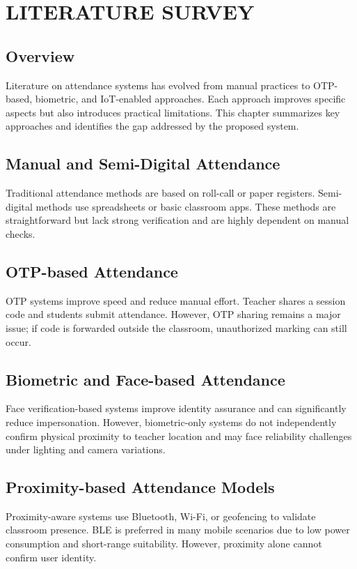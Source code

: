 \chapter{LITERATURE SURVEY} \label{c2}
\section{Overview}
Literature on attendance systems has evolved from manual practices to OTP-based, biometric, and IoT-enabled approaches. Each approach improves specific aspects but also introduces practical limitations. This chapter summarizes key approaches and identifies the gap addressed by the proposed system.

\section{Manual and Semi-Digital Attendance}
Traditional attendance methods are based on roll-call or paper registers. Semi-digital methods use spreadsheets or basic classroom apps. These methods are straightforward but lack strong verification and are highly dependent on manual checks.

\section{OTP-based Attendance}
OTP systems improve speed and reduce manual effort. Teacher shares a session code and students submit attendance. However, OTP sharing remains a major issue; if code is forwarded outside the classroom, unauthorized marking can still occur.

\section{Biometric and Face-based Attendance}
Face verification-based systems improve identity assurance and can significantly reduce impersonation. However, biometric-only systems do not independently confirm physical proximity to teacher location and may face reliability challenges under lighting and camera variations.

\section{Proximity-based Attendance Models}
Proximity-aware systems use Bluetooth, Wi-Fi, or geofencing to validate classroom presence. BLE is preferred in many mobile scenarios due to low power consumption and short-range suitability. However, proximity alone cannot confirm user identity.

